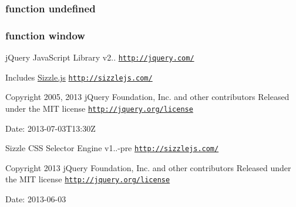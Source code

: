 \hypertarget{jquery-2_80_83_8js_a08113a236cc18d2a9d5ce27e638012be}{
\subsubsection[{undefined}]{\setlength{\rightskip}{0pt plus 5cm}function undefined}}\label{jquery-2_80_83_8js_a08113a236cc18d2a9d5ce27e638012be}
\hypertarget{jquery-2_80_83_8js_ad55530ae1e5978df8e721017c1fc8466}{
\subsubsection[{window}]{\setlength{\rightskip}{0pt plus 5cm}function window}}\label{jquery-2_80_83_8js_ad55530ae1e5978df8e721017c1fc8466}
j\+Query Java\+Script Library v2.. \href{http://jquery.com/}{\tt http\+://jquery.\+com/}

Includes \hyperlink{_sizzle_8js}{Sizzle.\+js} \href{http://sizzlejs.com/}{\tt http\+://sizzlejs.\+com/}

Copyright 2005, 2013 j\+Query Foundation, Inc. and other contributors Released under the M\+I\+T license \href{http://jquery.org/license}{\tt http\+://jquery.\+org/license}

Date\+: 2013-\/07-\/03\+T13\+:30\+Z

Sizzle C\+S\+S Selector Engine v1..-\/pre \href{http://sizzlejs.com/}{\tt http\+://sizzlejs.\+com/}

Copyright 2013 j\+Query Foundation, Inc. and other contributors Released under the M\+I\+T license \href{http://jquery.org/license}{\tt http\+://jquery.\+org/license}

Date\+: 2013-\/06-\/03 